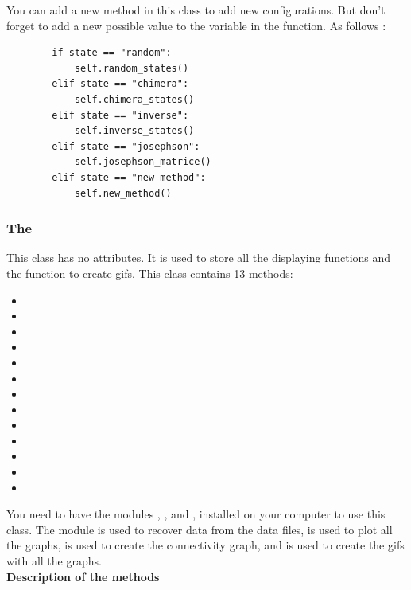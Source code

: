 \documentclass[1pt, a4paper]{article}
\begin{document}
You can add a new method in this class to add new configurations. But don't forget to add a new possible value to the  variable in the  function. As follows :
\begin{verbatim}
        if state == "random":
            self.random_states()
        elif state == "chimera":
            self.chimera_states()
        elif state == "inverse":
            self.inverse_states()
        elif state == "josephson":
            self.josephson_matrice()
        elif state == "new method":
            self.new_method()
\end{verbatim}
\subsubsection{The }
\label{subsubs:graph}
This class has no attributes. It is used to store all the displaying functions and the function to create gifs. This class contains 13 methods:
\begin{itemize}[itemsep=0pt]
    \item {}
    \item {}
    \item {}
    \item {}
    \item {}
    \item {}
    \item {}
    \item {}
    \item {}
    \item {}
    \item {}
    \item {}
    \item {}
\end{itemize}
\noindent
You need to have the modules , ,  and , installed on your computer to use this class. The module  is used to recover data from the data files,  is used to plot all the graphs,  is used to create the connectivity graph, and  is used to create the gifs with all the graphs.\\
\smallbreak
\noindent
\textbf{Description of the methods}\\
\end{document}
